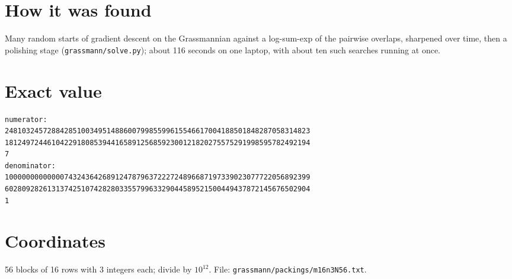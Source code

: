 \documentclass[11pt,a4paper]{article}
\begin{document}
\section{How it was found}
Many random starts of gradient descent on the Grassmannian against a log-sum-exp of the pairwise overlaps, sharpened over time, then a polishing stage (\texttt{grassmann/solve.py}); about 116 seconds on one laptop, with about ten such searches running at once.


\appendix
\section{Exact value}
{\small
\begin{verbatim}
numerator:
248103245728842851003495148860079985599615546617004188501848287058314823
181249724461042291808539441658912568592300121820275575291998595782492194
7
denominator:
100000000000007432436426891247879637222724896687197339023077722056892399
602809282613137425107428280335579963329044589521500449437872145676502904
1
\end{verbatim}}

\section{Coordinates}
56 blocks of 16 rows with 3 integers each; divide by $10^{12}$. File: \texttt{grassmann/packings/m16n3N56.txt}.
{\tiny
\begin{multicols}{3}
\end{multicols}}
\end{document}

